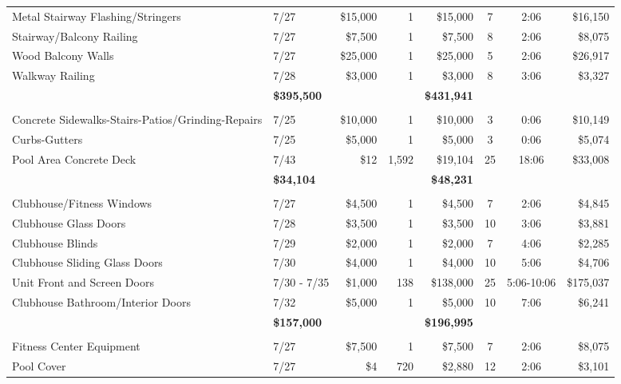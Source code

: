 \documentclass[11pt,letterpaper]{article}
\begin{document}
\begin{longtable}{p{4.2cm} p{1.6cm} r r r c c r}
\rowcolor{blue!12} Metal Stairway Flashing/Stringers & 7/27 & \$15,000 & 1 & \$15,000 & 7 & 2:06 & \$16,150 \\
Stairway/Balcony Railing & 7/27 & \$7,500 & 1 & \$7,500 & 8 & 2:06 & \$8,075 \\
\rowcolor{blue!12} Wood Balcony Walls & 7/27 & \$25,000 & 1 & \$25,000 & 5 & 2:06 & \$26,917 \\
Walkway Railing & 7/28 & \$3,000 & 1 & \$3,000 & 8 & 3:06 & \$3,327 \\
\addlinespace[1pt] \multicolumn{4}{r}{} & \textbf{\$395,500} & & & \textbf{\$431,941} \\
\addlinespace[6pt]
\multicolumn{8}{l}{\textbf{Concrete}} \\
\rowcolor{blue!12} Concrete Sidewalks-Stairs-Patios/Grinding-Repairs & 7/25 & \$10,000 & 1 & \$10,000 & 3 & 0:06 & \$10,149 \\
Curbs-Gutters & 7/25 & \$5,000 & 1 & \$5,000 & 3 & 0:06 & \$5,074 \\
\rowcolor{blue!12} Pool Area Concrete Deck & 7/43 & \$12 & 1,592 & \$19,104 & 25 & 18:06 & \$33,008 \\
\addlinespace[1pt] \multicolumn{4}{r}{} & \textbf{\$34,104} & & & \textbf{\$48,231} \\
\addlinespace[6pt]
\multicolumn{8}{l}{\textbf{Doors-Windows}} \\
Clubhouse/Fitness Windows & 7/27 & \$4,500 & 1 & \$4,500 & 7 & 2:06 & \$4,845 \\
\rowcolor{blue!12} Clubhouse Glass Doors & 7/28 & \$3,500 & 1 & \$3,500 & 10 & 3:06 & \$3,881 \\
Clubhouse Blinds & 7/29 & \$2,000 & 1 & \$2,000 & 7 & 4:06 & \$2,285 \\
\rowcolor{blue!12} Clubhouse Sliding Glass Doors & 7/30 & \$4,000 & 1 & \$4,000 & 10 & 5:06 & \$4,706 \\
Unit Front and Screen Doors & 7/30 - 7/35 & \$1,000 & 138 & \$138,000 & 25 & 5:06-10:06 & \$175,037 \\
\rowcolor{blue!12} Clubhouse Bathroom/Interior Doors & 7/32 & \$5,000 & 1 & \$5,000 & 10 & 7:06 & \$6,241 \\
\addlinespace[1pt] \multicolumn{4}{r}{} & \textbf{\$157,000} & & & \textbf{\$196,995} \\
\addlinespace[6pt]
\multicolumn{8}{l}{\textbf{Equipment}} \\
Fitness Center Equipment & 7/27 & \$7,500 & 1 & \$7,500 & 7 & 2:06 & \$8,075 \\
\rowcolor{blue!12} Pool Cover & 7/27 & \$4 & 720 & \$2,880 & 12 & 2:06 & \$3,101 \\

\end{longtable}
\end{document}
